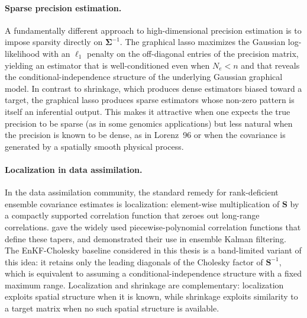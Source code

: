 \paragraph{Sparse precision estimation.}
A fundamentally different approach to high-dimensional precision estimation is to impose sparsity directly on $\boldsymbol{\Sigma}^{-1}$. The graphical lasso \citep{friedman2008sparse} maximizes the Gaussian log-likelihood with an $\ell_1$ penalty on the off-diagonal entries of the precision matrix, yielding an estimator that is well-conditioned even when $N_e < n$ and that reveals the conditional-independence structure of the underlying Gaussian graphical model. In contrast to shrinkage, which produces dense estimators biased toward a target, the graphical lasso produces sparse estimators whose non-zero pattern is itself an inferential output. This makes it attractive when one expects the true precision to be sparse (as in some genomics applications) but less natural when the precision is known to be dense, as in Lorenz~96 or when the covariance is generated by a spatially smooth physical process.

\paragraph{Localization in data assimilation.}
In the data assimilation community, the standard remedy for rank-deficient ensemble covariance estimates is localization: element-wise multiplication of $\mathbf{S}$ by a compactly supported correlation function that zeroes out long-range correlations. \citet{gaspari1999construction} gave the widely used piecewise-polynomial correlation functions that define these tapers, and \citet{houtekamer1998data} demonstrated their use in ensemble Kalman filtering. The EnKF-Cholesky baseline considered in this thesis is a band-limited variant of this idea: it retains only the leading diagonals of the Cholesky factor of $\mathbf{S}^{-1}$, which is equivalent to assuming a conditional-independence structure with a fixed maximum range. Localization and shrinkage are complementary: localization exploits spatial structure when it is known, while shrinkage exploits similarity to a target matrix when no such spatial structure is available.

